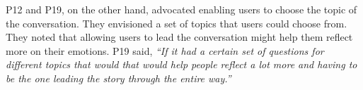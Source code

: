         
        P12 and P19, on the other hand, advocated enabling users to choose the topic of the conversation. They envisioned a set of topics that users could choose from. They noted that allowing users to lead the conversation might help them reflect more on their emotions. 
        P19 said,
        \textit{``If it had a certain set of questions for different topics that would that would help people reflect a lot more and having to be the one leading the story through the entire way.''}




